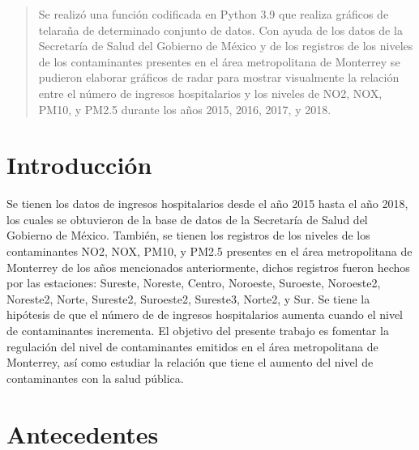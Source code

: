 \documentclass[a0]{sciposter} %
\begin{document}
\begin{multicols}{2} 

\begin{abstract}
Se realizó una función codificada en Python 3.9 \citep{python} que realiza gráficos de telaraña de determinado conjunto de datos. Con ayuda de los datos de la Secretaría de Salud del Gobierno de México y de los registros de los niveles de los contaminantes presentes en el área metropolitana de Monterrey se pudieron elaborar gráficos de radar para mostrar visualmente la relación entre el número de ingresos hospitalarios y los niveles de NO2, NOX, PM10, y PM2.5 durante los años 2015, 2016, 2017, y 2018.
\end{abstract}

\section{Introducción}

Se tienen los datos de ingresos hospitalarios desde el año 2015 hasta el año 2018, los cuales se obtuvieron de la base de datos de la Secretaría de Salud del Gobierno de México. También, se tienen los registros de los niveles de los contaminantes NO2, NOX, PM10, y PM2.5 presentes en el área metropolitana de Monterrey de los años mencionados anteriormente, dichos registros fueron hechos por las estaciones: Sureste, Noreste, Centro, Noroeste, Suroeste, Noroeste2, Noreste2, Norte, Sureste2, Suroeste2, Sureste3, Norte2, y Sur.
Se tiene la hipótesis de que el número de de ingresos hospitalarios aumenta cuando el nivel de contaminantes incrementa. 
El objetivo del presente trabajo es fomentar la regulación del nivel de contaminantes emitidos en el área metropolitana de Monterrey, así como estudiar la relación que tiene el aumento del nivel de contaminantes con la salud pública.

\section{Antecedentes}


\end{multicols}
\end{document}
